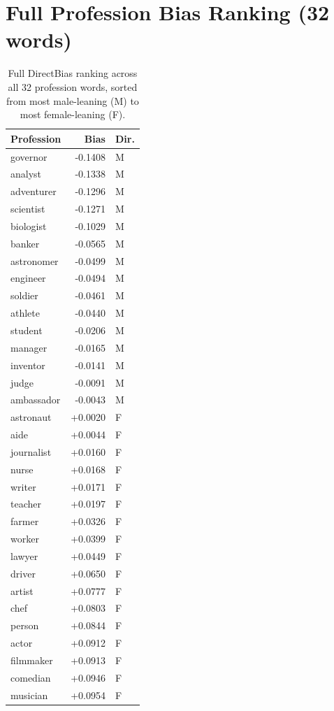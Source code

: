\documentclass[11pt]{article}
\begin{document}
\section{Full Profession Bias Ranking (32 words)}
\label{sec:appendix-a}

\begin{table}[h]
\centering
\small
\begin{tabular}{lrl}
\hline
\textbf{Profession} & \textbf{Bias} & \textbf{Dir.} \\
\hline
governor & -0.1408 & M \\
analyst & -0.1338 & M \\
adventurer & -0.1296 & M \\
scientist & -0.1271 & M \\
biologist & -0.1029 & M \\
banker & -0.0565 & M \\
astronomer & -0.0499 & M \\
engineer & -0.0494 & M \\
soldier & -0.0461 & M \\
athlete & -0.0440 & M \\
student & -0.0206 & M \\
manager & -0.0165 & M \\
inventor & -0.0141 & M \\
judge & -0.0091 & M \\
ambassador & -0.0043 & M \\
astronaut & +0.0020 & F \\
aide & +0.0044 & F \\
journalist & +0.0160 & F \\
nurse & +0.0168 & F \\
writer & +0.0171 & F \\
teacher & +0.0197 & F \\
farmer & +0.0326 & F \\
worker & +0.0399 & F \\
lawyer & +0.0449 & F \\
driver & +0.0650 & F \\
artist & +0.0777 & F \\
chef & +0.0803 & F \\
person & +0.0844 & F \\
actor & +0.0912 & F \\
filmmaker & +0.0913 & F \\
comedian & +0.0946 & F \\
musician & +0.0954 & F \\
\hline
\end{tabular}
\caption{Full DirectBias ranking across all 32 profession words, sorted from most male-leaning (M) to most female-leaning (F).}
\label{tab:bias-ranking}
\end{table}
\end{document}
